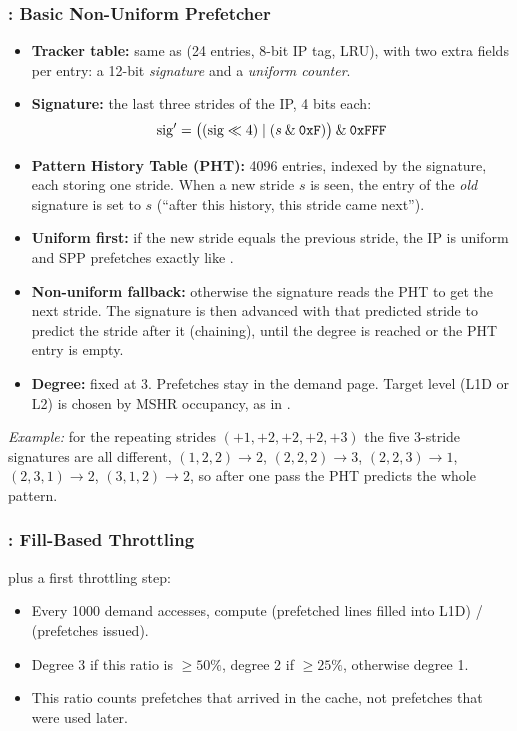 \subsubsection{: Basic Non-Uniform Prefetcher}
\begin{itemize}
  \item \textbf{Tracker table:} same as  (24 entries, 8-bit IP tag, LRU), with two extra fields per
        entry: a 12-bit \emph{signature} and a \emph{uniform counter}.
  \item \textbf{Signature:} the last three strides of the IP, 4 bits each:
        \[ \mathrm{sig}' = \bigl((\mathrm{sig} \ll 4) \mid (s \mathbin{\&} \texttt{0xF})\bigr) \mathbin{\&} \texttt{0xFFF} \]
  \item \textbf{Pattern History Table (PHT):} 4096 entries, indexed by the signature, each storing one stride.
        When a new stride $s$ is seen, the entry of the \emph{old} signature is set to $s$
        (``after this history, this stride came next'').
  \item \textbf{Uniform first:} if the new stride equals the previous stride, the IP is uniform and SPP prefetches
        exactly like .
  \item \textbf{Non-uniform fallback:} otherwise the signature reads the PHT to get the next stride. The signature
        is then advanced with that predicted stride to predict the stride after it (chaining), until the degree
        is reached or the PHT entry is empty.
  \item \textbf{Degree:} fixed at 3. Prefetches stay in the demand page. Target level (L1D or L2) is chosen by MSHR
        occupancy, as in .
\end{itemize}
\emph{Example:} for the repeating strides $(+1, +2, +2, +2, +3)$ the five 3-stride signatures are all different,
$(1,2,2)\to2$, $(2,2,2)\to3$, $(2,2,3)\to1$, $(2,3,1)\to2$, $(3,1,2)\to2$, so after one pass the PHT predicts the
whole pattern.

\subsubsection{: Fill-Based Throttling}
 plus a first throttling step:
\begin{itemize}
  \item Every 1000 demand accesses, compute (prefetched lines filled into L1D) / (prefetches issued).
  \item Degree 3 if this ratio is $\ge 50\%$, degree 2 if $\ge 25\%$, otherwise degree 1.
  \item This ratio counts prefetches that arrived in the cache, not prefetches that were used later.
\end{itemize}

